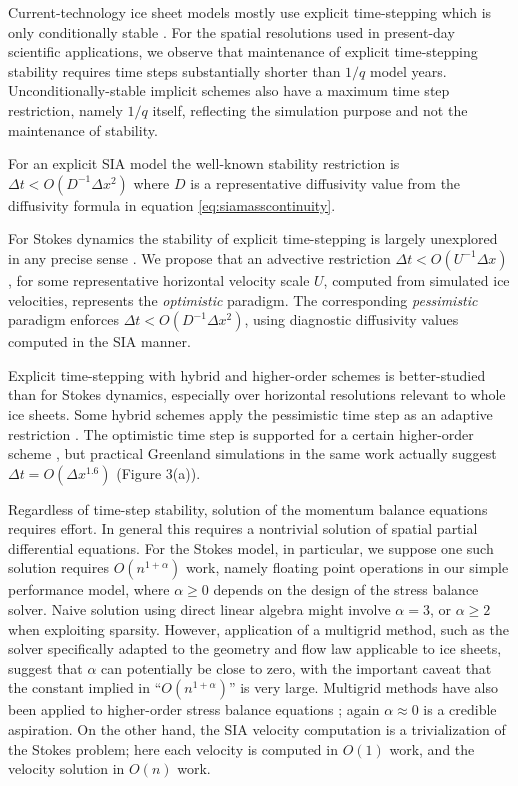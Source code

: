 \documentclass[twocolumn,letterpaper]{igs}
\begin{document}
Current-technology ice sheet models mostly use explicit time-stepping which is only conditionally stable \citep{LeVeque2007}.  For the spatial resolutions used in present-day scientific applications, we observe that maintenance of explicit time-stepping stability requires time steps substantially shorter than $1/q$ model years.  Unconditionally-stable implicit schemes also have a maximum time step restriction, namely $1/q$ itself, reflecting the simulation purpose and not the maintenance of stability.

For an explicit SIA model the well-known stability restriction is $\Delta t < O(D^{-1} \Delta x^2)$ \citep{Bueleretal2005,HindmarshPayne1996} where $D$ is a representative diffusivity value from the diffusivity formula in equation \eqref{eq:siamasscontinuity}.

For Stokes dynamics the stability of explicit time-stepping is largely unexplored in any precise sense \citep[compare][]{Chengetal2017}.  We propose that an advective restriction $\Delta t < O(U^{-1} \Delta x)$, for some representative horizontal velocity scale $U$, computed from simulated ice velocities, represents the \emph{optimistic} paradigm.  The corresponding \emph{pessimistic} paradigm enforces $\Delta t < O(D^{-1} \Delta x^2)$, using diagnostic diffusivity values computed in the SIA manner.

Explicit time-stepping with hybrid and higher-order schemes is better-studied than for Stokes dynamics, especially over horizontal resolutions relevant to whole ice sheets.  Some hybrid schemes apply the pessimistic time step as an adaptive restriction \citep{Winkelmannetal2011}.  The optimistic time step is supported for a certain higher-order scheme \citep[``DIVA'';][equation (52)]{Robinsonetal2022}, but practical Greenland simulations in the same work actually suggest $\Delta t = O(\Delta x^{1.6})$ (Figure 3(a)).

Regardless of time-step stability, solution of the momentum balance equations requires effort.  In general this requires a nontrivial solution of spatial partial differential equations.  For the Stokes model, in particular, we suppose one such solution requires $O(n^{1+\alpha})$ work, namely floating point operations in our simple performance model, where $\alpha\ge 0$ depends on the design of the stress balance solver.  Naive solution using direct linear algebra might involve $\alpha=3$, or $\alpha \ge 2$ when exploiting sparsity.  However, application of a multigrid method, such as the \cite{IsaacStadlerGhattas2015} solver specifically adapted to the geometry and flow law applicable to ice sheets, suggest that $\alpha$ can potentially be close to zero, with the important caveat that the constant implied in ``$O(n^{1+\alpha})$'' is very large.  Multigrid methods have also been applied to higher-order stress balance equations \citep{BrownSmithAhmadia2013}; again $\alpha \approx 0$ is a credible aspiration.  On the other hand, the SIA velocity computation is a trivialization of the Stokes problem; here each velocity is computed in $O(1)$ work, and the velocity solution in $O(n)$ work.
\end{document}
